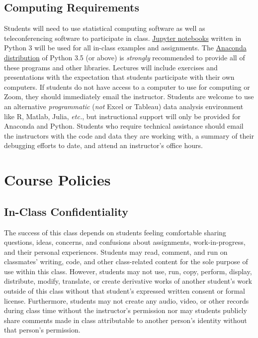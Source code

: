 \documentclass[10pt]{memoir}
\begin{document}
\subsection{Computing Requirements}
Students will need to use statistical computing software as well as teleconferencing software to participate in class. \href{http://jupyter.org/}{Jupyter notebooks} written in Python 3 will be used for all in-class examples and assignments. The \href{https://www.continuum.io/why-anaconda}{Anaconda distribution} of Python 3.5 (or above) is \textit{strongly} recommended to provide all of these programs and other libraries. Lectures will include exercises and presentations with the expectation that students participate with their own computers. If students do not have access to a computer to use for computing or Zoom, they should immediately email the instructor. Students are welcome to use an alternative \textit{programmatic} (\textit{not} Excel or Tableau) data analysis environment like R, Matlab, Julia, \textit{etc.}, but instructional support will only be provided for Anaconda and Python. Students who require technical assistance should email the instructors with the code and data they are working with, a summary of their debugging efforts to date, and attend an instructor's office hours.


\section{Course Policies}


\subsection{In-Class Confidentiality}
The success of this class depends on students feeling comfortable sharing questions, ideas, concerns, and confusions about assignments, work-in-progress, and their personal experiences. Students may read, comment, and run on classmates' writing, code, and other class-related content for the sole purpose of use within this class. However, students may not use, run, copy, perform, display, distribute, modify, translate, or create derivative works of another student's work outside of this class without that student's expressed written consent or formal license. Furthermore, students may not create any audio, video, or other records during class time without the instructor's permission nor may students publicly share comments made in class attributable to another person's identity without that person's permission.
\end{document}
